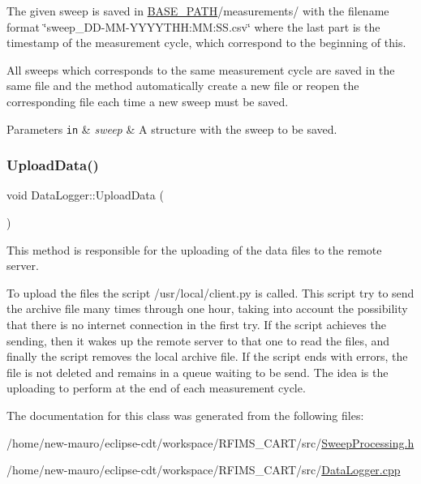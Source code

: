 The given sweep is saved in \hyperlink{Basics_8h_a0423f4cb393331ce0b9f6b3a43adcaae}{B\+A\+S\+E\+\_\+\+P\+A\+TH}/measurements/ with the filename format \char`\"{}sweep\+\_\+\+D\+D-\/\+M\+M-\/\+Y\+Y\+Y\+Y\+T\+H\+H\+:\+M\+M\+:\+S\+S.\+csv\char`\"{} where the last part is the timestamp of the measurement cycle, which correspond to the beginning of this.

All sweeps which corresponds to the same measurement cycle are saved in the same file and the method automatically create a new file or reopen the corresponding file each time a new sweep must be saved. 
\begin{DoxyParams}[1]{Parameters}
\mbox{\tt in}  & {\em sweep} & A structure with the sweep to be saved. \\
\hline
\end{DoxyParams}
\mbox{\label{classDataLogger_ab58f4cc05f738ef757c884fe9ef131eb}} 
\subsubsection{\texorpdfstring{Upload\+Data()}{UploadData()}}
{\footnotesize\ttfamily void Data\+Logger\+::\+Upload\+Data (\begin{DoxyParamCaption}{ }\end{DoxyParamCaption})}



This method is responsible for the uploading of the data files to the remote server. 

To upload the files the script /usr/local/client.py is called. This script try to send the archive file many times through one hour, taking into account the possibility that there is no internet connection in the first try. If the script achieves the sending, then it wakes up the remote server to that one to read the files, and finally the script removes the local archive file. If the script ends with errors, the file is not deleted and remains in a queue waiting to be send. The idea is the uploading to perform at the end of each measurement cycle. 

The documentation for this class was generated from the following files\+:\begin{DoxyCompactItemize}
\item 
/home/new-\/mauro/eclipse-\/cdt/workspace/\+R\+F\+I\+M\+S\+\_\+\+C\+A\+R\+T/src/\hyperlink{SweepProcessing_8h}{Sweep\+Processing.\+h}\item 
/home/new-\/mauro/eclipse-\/cdt/workspace/\+R\+F\+I\+M\+S\+\_\+\+C\+A\+R\+T/src/\hyperlink{DataLogger_8cpp}{Data\+Logger.\+cpp}\end{DoxyCompactItemize}
